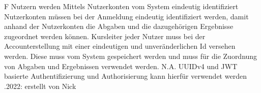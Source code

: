 \begin{myreq}
    \threeinline
    {\reqno}
    {\reqtype F}
    {}
    \reqdesc Nutzern werden Mittels Nutzerkonten vom System eindeutig identifiziert
    \reqrat Nutzerkonten müssen bei der Anmeldung eindeutig identifiziert werden, damit anhand der Nutzerkonten die Abgaben und die dazugehörigen Ergebnisse zugeordnet werden können.
    \reqorig Kursleiter
    \reqfit jeder Nutzer muss bei der Accounterstellung mit einer eindeutigen und unveränderlichen Id versehen werden. Diese muss vom System gespeichert werden und muss für die Zuordnung von Abgaben und Ergebnissen verwendet werden.
    \twoinline
    {}
    {}
    \twoinline
    {}
    {\reqconf N.A.}
    \reqmater UUIDv4 und JWT basierte Authentifizierung und Authorisierung kann hierfür verwendet werden  
    .2022: erstellt von Nick
\end{myreq}